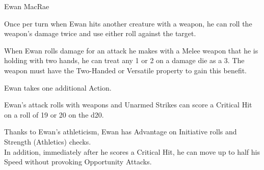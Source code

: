 \begin{DndMonster}[width=0.5\textwidth]{Ewan MacRae}
	
	\DndMonsterBasics[
		armor-class = {17 (Splint Mail)},
		initiative	= +4,
		hit-points  = {\DndDice{4d10 + 8}},
		speed       = {30 ft.},
	]
	
	\renewcommand{\AbilityScoreSpacer}{~}
	\DndMonsterAbilityScores[
		str = 18,
		dex = 18,
		con = 15,
		int = 8,
		wis = 13,
		cha = 14,
	]
	
	\DndMonsterDetails[
		saving-throws			= {STR +6, CON +4},
		skills					= {Athletics +6, Animal Handling +3, Perception +3},
		senses					= {Passive Perception 13},
		languages				= {Common},
	]
	
    Once per turn when Ewan hits another creature with a weapon, he can roll the weapon's damage twice and use either roll against the target.
    
	When Ewan rolls damage for an attack he makes with a Melee weapon that he is holding with two hands, he can treat any 1 or 2 on a damage die as a 3. The weapon must have the Two-Handed or Versatile property to gain this benefit.
	
    Ewan takes one additional Action.
	
	Ewan's attack rolls with weapons and Unarmed Strikes can score a Critical Hit on a roll of 19 or 20 on the d20.
	
	Thanks to Ewan's athleticism, Ewan has Advantage on Initiative rolls and Strength (Athletics) checks.\\
	In addition, immediately after he scores a Critical Hit, he can move up to half his Speed without provoking Opportunity Attacks.
	
	\DndMonsterAttack[
		name			= Greatsword,
		distance		= melee,	%
		mod				= +6,
		reach			= 5,
		targets			= one target,
		dmg				= \DndDice{2d6 + 4},
		dmg-type		= Slashing,
	]
	

\end{DndMonster}
